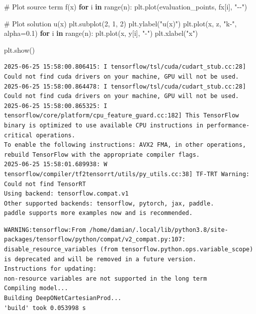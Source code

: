\documentclass[
  spanish,
  us-letterpaper,
  DIV=11,
  numbers=noendperiod]{scrreprt}
\newenvironment{Shaded}{\begin{snugshade}}{\end{snugshade}}
\newcommand{\BuiltInTok}[1]{\textcolor[rgb]{0.00,0.23,0.31}{#1}}
\newcommand{\CommentTok}[1]{\textcolor[rgb]{0.37,0.37,0.37}{#1}}
\newcommand{\ControlFlowTok}[1]{\textcolor[rgb]{0.00,0.23,0.31}{\textbf{#1}}}
\newcommand{\DecValTok}[1]{\textcolor[rgb]{0.68,0.00,0.00}{#1}}
\newcommand{\FloatTok}[1]{\textcolor[rgb]{0.68,0.00,0.00}{#1}}
\newcommand{\KeywordTok}[1]{\textcolor[rgb]{0.00,0.23,0.31}{\textbf{#1}}}
\newcommand{\NormalTok}[1]{\textcolor[rgb]{0.00,0.23,0.31}{#1}}
\newcommand{\OperatorTok}[1]{\textcolor[rgb]{0.37,0.37,0.37}{#1}}
\newcommand{\StringTok}[1]{\textcolor[rgb]{0.13,0.47,0.30}{#1}}
\theoremstyle{definition}
\theoremstyle{plain}
\theoremstyle{remark}
\begin{document}
\begin{Shaded}
\begin{Highlighting}[]
\CommentTok{\# Plot source term f(x)}
\ControlFlowTok{for}\NormalTok{ i }\KeywordTok{in} \BuiltInTok{range}\NormalTok{(n):}
\NormalTok{    plt.plot(evaluation\_points, fx[i], }\StringTok{"{-}{-}"}\NormalTok{)}

\CommentTok{\# Plot solution u(x)}
\NormalTok{plt.subplot(}\DecValTok{2}\NormalTok{, }\DecValTok{1}\NormalTok{, }\DecValTok{2}\NormalTok{)}
\NormalTok{plt.ylabel(}\StringTok{"u(x)"}\NormalTok{)}
\NormalTok{plt.plot(x, z, }\StringTok{"k{-}"}\NormalTok{, alpha}\OperatorTok{=}\FloatTok{0.1}\NormalTok{)}
\ControlFlowTok{for}\NormalTok{ i }\KeywordTok{in} \BuiltInTok{range}\NormalTok{(n):}
\NormalTok{    plt.plot(x, y[i], }\StringTok{"{-}"}\NormalTok{)}
\NormalTok{plt.xlabel(}\StringTok{"x"}\NormalTok{)}

\NormalTok{plt.show()}
\end{Highlighting}
\end{Shaded}

\begin{verbatim}
2025-06-25 15:58:00.806415: I tensorflow/tsl/cuda/cudart_stub.cc:28] Could not find cuda drivers on your machine, GPU will not be used.
2025-06-25 15:58:00.864478: I tensorflow/tsl/cuda/cudart_stub.cc:28] Could not find cuda drivers on your machine, GPU will not be used.
2025-06-25 15:58:00.865325: I tensorflow/core/platform/cpu_feature_guard.cc:182] This TensorFlow binary is optimized to use available CPU instructions in performance-critical operations.
To enable the following instructions: AVX2 FMA, in other operations, rebuild TensorFlow with the appropriate compiler flags.
2025-06-25 15:58:01.689938: W tensorflow/compiler/tf2tensorrt/utils/py_utils.cc:38] TF-TRT Warning: Could not find TensorRT
Using backend: tensorflow.compat.v1
Other supported backends: tensorflow, pytorch, jax, paddle.
paddle supports more examples now and is recommended.
\end{verbatim}

\begin{verbatim}
WARNING:tensorflow:From /home/damian/.local/lib/python3.8/site-packages/tensorflow/python/compat/v2_compat.py:107: disable_resource_variables (from tensorflow.python.ops.variable_scope) is deprecated and will be removed in a future version.
Instructions for updating:
non-resource variables are not supported in the long term
Compiling model...
Building DeepONetCartesianProd...
'build' took 0.053998 s
\end{verbatim}
\end{document}
